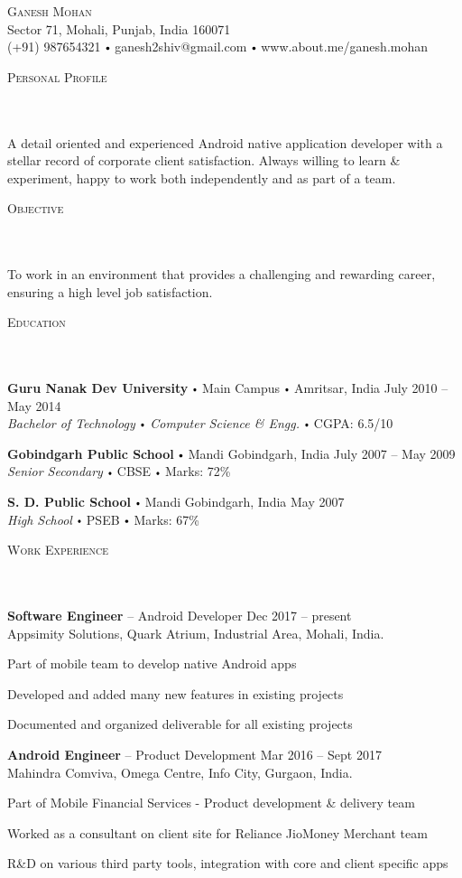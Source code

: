 \documentclass{article}
\newcommand{\contact}[3]{
\vspace*{5pt}
\begin{center}
{\LARGE \scshape {#1}}\\
\vspace{3pt}
#2 
\vspace{2pt}
#3
\end{center}
\vspace*{-8pt}
}
\newcommand{\header}[1]{{
\hspace*{-15pt}\vspace*{6pt} \textsc{#1}} \vspace*{-6pt} 
\lineunder
}
\newcommand{\lineunder}{
\vspace*{-8pt} \\ \hspace*{-18pt} 
\hrulefill \\
}
\newcommand{\content}{
\vspace*{2pt}%
}
\newcommand{\college}[5]{\vspace*{2pt}%
\textbf{#1} \labelitemi #2 \labelitemi #3 \hfill #4 \\ #5 
\vspace*{5pt}
}
\newcommand{\school}[4]{
\textbf{#1} \labelitemi #2 \hfill #3 \\ #4 \vspace*{5pt}
}
\newcommand{\employer}[4]{{
\vspace*{2pt}%
\textbf{#1} #2 \hfill #3\\ #4 \vspace*{2pt}}
}
\renewcommand{\labelitemi}{
$\vcenter{\hbox{\tiny$\bullet$}}$\hspace*{3pt}
}
\renewcommand{\labelitemii}{
$\vcenter{\hbox{\tiny$\bullet$}}$\hspace*{-3pt}
}
\newenvironment{bullet-list-minor}{
\begin{list}{\labelitemii}{\setlength\leftmargin{15pt} 
\topsep 0pt \itemsep -2pt}}{\vspace*{4pt}\end{list}
}
\begin{document}
\small
\smallskip
\vspace*{-44pt}

\contact{Ganesh Mohan}
{Sector 71, Mohali, Punjab, India 160071\\}
{(+91) 987654321 \labelitemi ganesh2shiv@gmail.com \labelitemi www.about.me/ganesh.mohan}
\vspace{15pt}
\header{Personal Profile}
    \content{A detail oriented and experienced Android native application developer with a stellar record of corporate client satisfaction. Always willing to learn \& experiment, happy to work both independently and as part of a team.\vspace{5pt}}

\vspace*{4pt}%
\header{Objective}
    \content{To work in an environment that provides a challenging and rewarding career, ensuring a high level job satisfaction.\vspace{5pt}}

\vspace*{4pt}%
\header{Education}
    \college{Guru Nanak Dev University}{Main Campus}{Amritsar, India}{July 2010 -- May 2014}
    {\textit{Bachelor of Technology \labelitemi Computer Science \& Engg.}\labelitemi CGPA: 6.5/10}

    \school{Gobindgarh Public School}{Mandi Gobindgarh, India}{July 2007 -- May 2009}
    {\textit{Senior Secondary} \labelitemi CBSE \labelitemi Marks: 72\%}

    \school{S. D. Public School}{Mandi Gobindgarh, India}{May 2007}
    {\textit{High School} \labelitemi PSEB \labelitemi Marks: 67\%}

\vspace*{4pt}%
\header{Work Experience}
    \employer{Software Engineer}{-- Android Developer}{Dec 2017 -- present}{Appsimity Solutions, Quark Atrium, Industrial Area, Mohali, India.}
	\begin{bullet-list-minor}
	\item Part of mobile team to develop native Android apps
	\item Developed and added many new features in existing projects
	\item Documented and organized deliverable for all existing projects   
    \end{bullet-list-minor}

    \employer{Android Engineer}{-- Product Development}{Mar 2016 -- Sept 2017}{Mahindra Comviva, Omega Centre, Info City, Gurgaon, India.}
	\begin{bullet-list-minor}
	\item Part of Mobile Financial Services - Product development \& delivery team
	\item Worked as a consultant on client site for Reliance JioMoney Merchant team
	\item R\&D on various third party tools, integration with core and client specific apps
    \end{bullet-list-minor}
\end{document}
